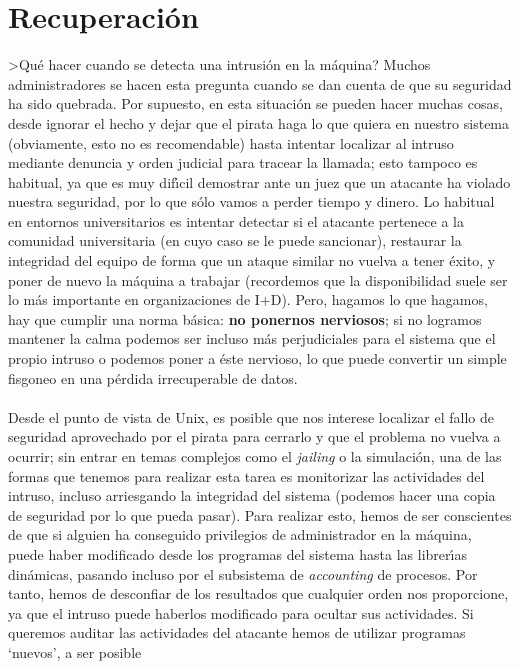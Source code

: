 \section{Recuperaci\'on}
>Qu\'e hacer cuando se detecta una intrusi\'on en la m\'aquina? Muchos 
administradores se hacen esta pregunta cuando se dan cuenta de que su seguridad
ha sido quebrada. Por supuesto, en esta situaci\'on se pueden hacer muchas 
cosas, desde ignorar el hecho y dejar que el pirata haga lo que quiera en 
nuestro sistema (obviamente, esto no es recomendable) hasta intentar localizar
al intruso mediante denuncia y orden judicial para tracear la llamada; esto
tampoco es habitual, ya que es muy dif\'{\i}cil demostrar ante un juez que un 
atacante ha violado nuestra seguridad, por lo que s\'olo vamos a perder tiempo
y dinero. Lo habitual en entornos universitarios es intentar detectar si el
atacante pertenece a la comunidad universitaria (en cuyo caso se le puede 
sancionar), restaurar la integridad del equipo de forma que un ataque similar 
no vuelva a tener \'exito, y poner de nuevo la m\'aquina a trabajar (recordemos
que la disponibilidad suele ser lo m\'as importante en organizaciones de I+D). 
Pero, hagamos lo que hagamos, hay que cumplir una norma b\'asica: {\bf no 
ponernos nerviosos}; si no logramos mantener la calma podemos ser incluso m\'as
perjudiciales para el sistema que el propio intruso o podemos poner a \'este
nervioso, lo que puede convertir un simple fisgoneo en una p\'erdida 
irrecuperable de datos.\\
\\Desde el punto de vista de Unix, es posible que nos interese localizar el 
fallo de seguridad a\-pro\-ve\-cha\-do por el pirata para cerrarlo y que el problema
no vuelva a ocurrir; sin entrar en temas complejos como el {\it jailing} o la
simulaci\'on, una de las formas que tenemos para realizar esta tarea es 
mo\-ni\-to\-ri\-zar las actividades del intruso, incluso arriesgando la integridad del
sistema (podemos hacer una copia de seguridad por lo que pueda pasar). Para 
realizar esto, hemos de ser conscientes de que si alguien ha conseguido 
privilegios de administrador en la m\'aquina, puede haber modificado desde los
programas del sistema hasta las librer\'{\i}as din\'amicas, pasando incluso por
el subsistema de {\it accounting} de procesos. Por tanto, hemos de desconfiar
de los resultados que cualquier orden nos proporcione, ya que el intruso puede
haberlos modificado para ocultar sus actividades. Si queremos auditar las
actividades del atacante hemos de utilizar programas `nuevos', a ser posible
